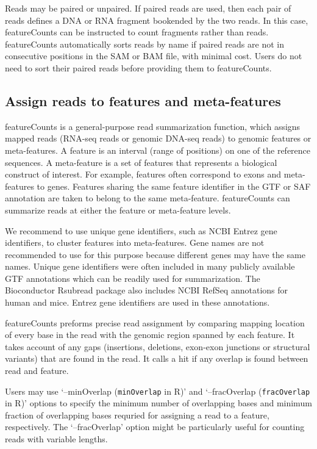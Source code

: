 \documentclass[12pt]{report}
\newcommand{\code}[1]{{\small\texttt{#1}}}
\newcommand{\Rsubread}{\textsf{Rsubread}}
\newcommand{\featureCounts}{\textsf{featureCounts}}
\newcommand{\R}{\textsf{R}}
\begin{document}
Reads may be paired or unpaired.
If paired reads are used, then each pair of reads defines a DNA or RNA fragment bookended by the two reads.
In this case, {\featureCounts} can be instructed to count fragments rather than reads.
{\featureCounts} automatically sorts reads by name if paired reads are not in consecutive positions in the SAM or BAM file, with minimal cost.
Users do not need to sort their paired reads before providing them to {\featureCounts}.

\subsection{Assign reads to features and meta-features}

{\featureCounts} is a general-purpose read summarization function, which assigns mapped reads (RNA-seq reads or genomic DNA-seq reads) to genomic features or meta-features.
A feature is an interval (range of positions) on one of the reference sequences.
A meta-feature is a set of features that represents a biological construct of interest.
For example, features often correspond to exons and meta-features to genes. Features sharing the same feature identifier in the GTF or SAF annotation are taken to belong to the same meta-feature. {\featureCounts} can summarize reads at either the feature or meta-feature levels.

We recommend to use unique gene identifiers, such as NCBI Entrez gene identifiers, to cluster features into meta-features. Gene names are not recommended to use for this purpose because different genes may have the same names. Unique gene identifiers were often included in many publicly available GTF annotations which can be readily used for summarization. The Bioconductor {\Rsubread} package also includes NCBI RefSeq annotations for human and mice. Entrez gene identifiers are used in these annotations.

{\featureCounts} preforms precise read assignment by comparing mapping location of every base in the read with the genomic region spanned by each feature.
It takes account of any gaps (insertions, deletions, exon-exon junctions or structural variants) that are found in the read.
It calls a hit if any overlap is found between read and feature.

Users may use `--minOverlap (\code{minOverlap} in \R)' and `--fracOverlap (\code{fracOverlap} in \R)' options to specify the minimum number of overlapping bases and minimum fraction of overlapping bases requried for assigning a read to a feature, respectively.
The `--fracOverlap' option might be particularly useful for counting reads with variable lengths.
\end{document}
